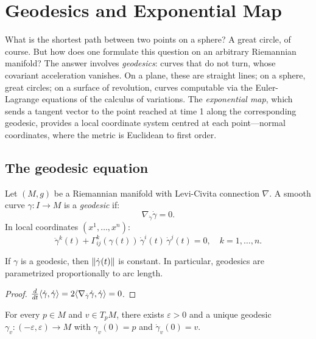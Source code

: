 \chapter{Geodesics and Exponential Map}
\label{ch:geodesics}

What is the shortest path between two points on a sphere? A great circle, of course. But how does one formulate this question on an arbitrary Riemannian manifold? The answer involves \emph{geodesics}: curves that do not turn, whose covariant acceleration vanishes. On a plane, these are straight lines; on a sphere, great circles; on a surface of revolution, curves computable via the Euler-Lagrange equations of the calculus of variations. The \emph{exponential map}, which sends a tangent vector to the point reached at time 1 along the corresponding geodesic, provides a local coordinate system centred at each point---normal coordinates, where the metric is Euclidean to first order.

\section{The geodesic equation}

\begin{definition}[Geodesic]
Let $(M, g)$ be a Riemannian manifold with Levi-Civita connection $\nabla$.
A smooth curve $\gamma : I \to M$ is a \emph{geodesic} if:
\[
    \nabla_{\dot\gamma}\dot\gamma = 0.
\]
In local coordinates $(x^1, \ldots, x^n)$:
\[
    \ddot\gamma^k(t) + \Gamma^k_{ij}(\gamma(t))\, \dot\gamma^i(t)\, \dot\gamma^j(t) = 0,
    \quad k = 1, \ldots, n.
\]
\end{definition}

\begin{proposition}
If $\gamma$ is a geodesic, then $\left\| \dot\gamma(t) \right\|$ is constant. In particular,
geodesics are parametrized proportionally to arc length.
\end{proposition}

\begin{proof}
$\frac{d}{dt}\langle \dot\gamma, \dot\gamma \rangle = 2\langle \nabla_{\dot\gamma}\dot\gamma, \dot\gamma \rangle
= 0$.
\end{proof}

\begin{theorem}
For every $p \in M$ and $v \in T_pM$, there exists $\varepsilon > 0$ and a unique
geodesic $\gamma_v : (-\varepsilon, \varepsilon) \to M$ with $\gamma_v(0) = p$ and
$\dot\gamma_v(0) = v$.
\end{theorem}

